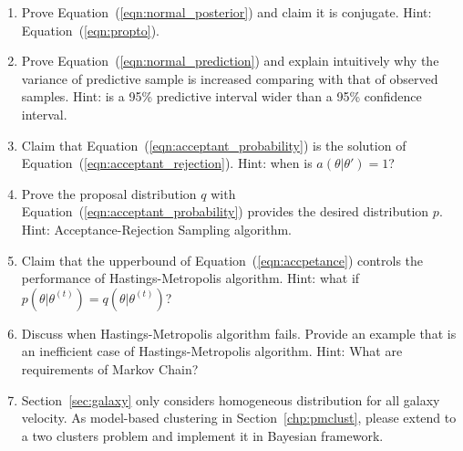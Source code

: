 \begin{enumerate}[label=\thechapter-\arabic*]

\item
Prove Equation~(\ref{eqn:normal_posterior}) and claim it is conjugate.
{\color{blue} Hint: Equation~(\ref{eqn:propto}). }

\item
Prove Equation~(\ref{eqn:normal_prediction}) and explain intuitively why
the variance of predictive sample is increased comparing with that of
observed samples.
{\color{blue} Hint: is a 95\% predictive interval wider than a 95\% confidence
interval. }

\item
Claim that Equation~(\ref{eqn:acceptant_probability}) is the solution of
Equation~(\ref{eqn:acceptant_rejection}).
{\color{blue} Hint: when is $a(\theta | \theta') = 1$? }

\item
Prove the proposal distribution $q$ with
Equation~(\ref{eqn:acceptant_probability}) provides the desired
distribution $p$.
{\color{blue} Hint: Acceptance-Rejection Sampling algorithm. }

\item
Claim that the upperbound of Equation~(\ref{eqn:accpetance}) controls
the performance of Hastings-Metropolis algorithm.
{\color{blue} Hint: what if
$p(\theta | \theta^{(t)}) = q(\theta | \theta^{(t)})$? }

\item
Discuss when Hastings-Metropolis algorithm fails. Provide an example
that is an inefficient case of Hastings-Metropolis algorithm.
{\color{blue} Hint: What are requirements of Markov Chain? }

\item
Section~\ref{sec:galaxy} only considers homogeneous distribution for all
galaxy velocity. As model-based clustering in Section~\ref{chp:pmclust},
please extend to a two clusters problem and implement it in Bayesian
framework.

\end{enumerate}

